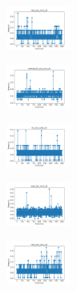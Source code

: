 \begin{figure}[H]
    \begin{subfigure}
        \centering
        \includegraphics[width=0.234\textwidth]{img/aggsf/rand_set_const_20_277451237_time.png}
    \end{subfigure}
    \hfill
    \begin{subfigure}
        \centering
        \includegraphics[width=0.234\textwidth]{img/aggsf/newthyroid_set_const_20_277451237_time.png}
    \end{subfigure}
    \hfill
    \begin{subfigure}
        \centering
        \includegraphics[width=0.234\textwidth]{img/aggsf/iris_set_const_20_49258669_time.png}
    \end{subfigure}
    \hfill
    \begin{subfigure}
        \centering
        \includegraphics[width=0.234\textwidth]{img/aggsf/ecoli_set_const_20_49258669_time.png}
    \end{subfigure}
    \hfill
    \begin{subfigure}
        \centering
        \includegraphics[width=0.234\textwidth]{img/aggsf/rand_set_const_20_49258669_time.png}
    \end{subfigure}
    \hfill
    \begin{subfigure}
        \centering

\end{subfigure}
\end{figure}
